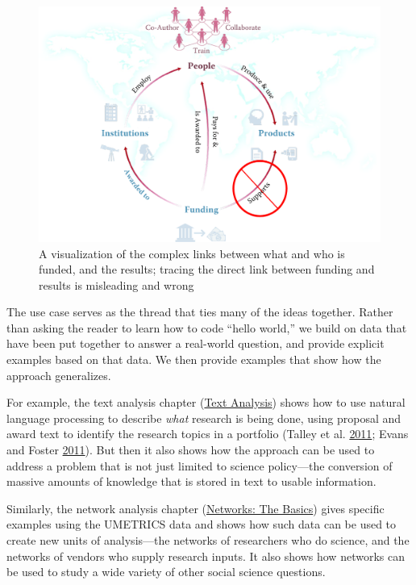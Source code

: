 \documentclass[]{krantz}
\begin{document}
\begin{figure}

{\centering \includegraphics[width=0.7\linewidth]{ChapterIntro/figures/figure_cameron} 

}

\caption{A visualization of the complex links between what and who is funded, and the results; tracing the direct link between funding and results is misleading and wrong}\label{fig:fig2}
\end{figure}

The use case serves as the thread that ties many of the ideas together.
Rather than asking the reader to learn how to code ``hello world,'' we
build on data that have been put together to answer a real-world
question, and provide explicit examples based on that data. We then
provide examples that show how the approach generalizes.

For example, the text analysis chapter
(\protect\hyperlink{chap:text}{Text Analysis}) shows how to use natural
language processing to describe \emph{what} research is being done,
using proposal and award text to identify the research topics in a
portfolio (Talley et al.
\protect\hyperlink{ref-talley2011database}{2011}; Evans and Foster
\protect\hyperlink{ref-Evans2011}{2011}). But then it also shows how the
approach can be used to address a problem that is not just limited to
science policy---the conversion of massive amounts of knowledge that is
stored in text to usable information.

Similarly, the network analysis chapter
(\protect\hyperlink{chap:networks}{Networks: The Basics}) gives specific
examples using the UMETRICS data and shows how such data can be used to
create new units of analysis---the networks of researchers who do
science, and the networks of vendors who supply research inputs. It also
shows how networks can be used to study a wide variety of other social
science questions.
\end{document}
